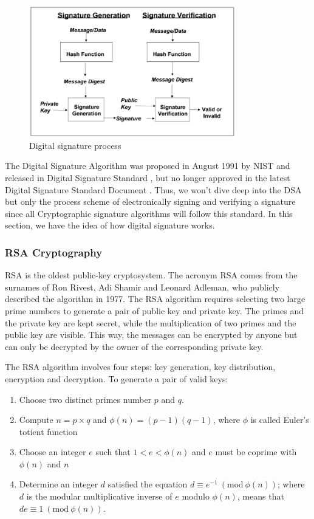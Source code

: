 \begin{figure}[ht!]
  \centering
  \includegraphics[width=0.8\textwidth]{images/digital_signature.png}
  \caption[Digital signature process]{Digital signature process}
  \label{fig:digital_signature}
\end{figure}

The Digital Signature Algorithm was proposed in August 1991 by NIST and released in Digital Signature Standard \cite{DSS1998}, but no longer approved in the latest Digital Signature Standard Document \cite{DSS2019}.
Thus, we won't dive deep into the DSA but only the process scheme of electronically signing and verifying a signature since all Cryptographic signature algorithms will follow this standard.
In this section, we have the idea of how digital signature works.

\subsubsection{RSA Cryptography}

RSA is the oldest public-key cryptosystem. The acronym RSA comes from the surnames of Ron Rivest, Adi Shamir and Leonard Adleman, who publicly described the algorithm in 1977. The RSA algorithm requires selecting two large prime numbers to generate a pair of public key and private key. The primes and the private key are kept secret, while the multiplication of two primes and the public key are visible. This way, the messages can be encrypted by anyone but can only be decrypted by the owner of the corresponding private key.

The RSA algorithm involves four steps: key generation, key distribution, encryption and decryption. To generate a pair of valid keys:

\begin{enumerate}
  \item Choose two distinct primes number $p$ and $q$.
  \item Compute $n = p \times q$ and $\phi(n) = (p - 1)(q - 1)$, where $\phi$ is called Euler's totient function
  \item Choose an integer $e$ such that $1 < e < \phi(n)$ and $e$ must be coprime with $\phi(n)$ and $n$
  \item Determine an integer $d$ satisfied the equation $d \equiv e^{-1}\ (\textrm{mod}\ \phi(n))$; where $d$ is the modular multiplicative inverse of $e$ modulo $\phi(n)$, means that $de \equiv 1\ (\textrm{mod}\ \phi(n))$.
\end{enumerate}

